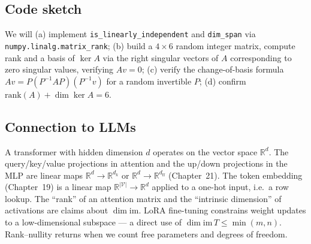 \subsection*{Code sketch}

We will (a) implement \texttt{is\_linearly\_independent} and \texttt{dim\_span} via \texttt{numpy.linalg.matrix\_rank}; (b) build a $4\times 6$ random integer matrix, compute rank and a basis of $\ker A$ via the right singular vectors of $A$ corresponding to zero singular values, verifying $Av = 0$; (c) verify the change-of-basis formula $Av = P(P^{-1}AP)(P^{-1}v)$ for a random invertible $P$; (d) confirm $\mathrm{rank}(A) + \dim\ker A = 6$.

\subsection*{Connection to LLMs}

A transformer with hidden dimension $d$ operates on the vector space $\mathbb{R}^d$. The query/key/value projections in attention and the up/down projections in the MLP are linear maps $\mathbb{R}^d\to\mathbb{R}^{d_k}$ or $\mathbb{R}^d\to\mathbb{R}^{d_{\mathrm{ff}}}$ (Chapter~21). The token embedding (Chapter~19) is a linear map $\mathbb{R}^{|\mathcal{V}|}\to\mathbb{R}^d$ applied to a one-hot input, i.e.\ a row lookup. The ``rank'' of an attention matrix and the ``intrinsic dimension'' of activations are claims about $\dim\mathrm{im}$. LoRA fine-tuning constrains weight updates to a low-dimensional subspace --- a direct use of $\dim\mathrm{im}\,T \le \min(m,n)$. Rank--nullity returns when we count free parameters and degrees of freedom.
